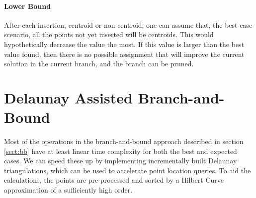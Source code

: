 \paragraph{Lower Bound}
After each insertion, centroid or non-centroid, one can assume that, the best case scenario, all the points not yet inserted will be centroids. This would hypothetically decrease the value the most. If this value is larger than the best value found, then there is no possible assignment that will improve the current solution in the current branch, and the branch can be pruned.
\paragraph{}
\section{Delaunay Assisted Branch-and-Bound}
\label{alg:da}
\paragraph{}
Most of the operations in the branch-and-bound approach described in section \ref{sect:bb} have at least linear time complexity for both the best and expected cases. We can speed these up by implementing incrementally built Delaunay triangulations, which can be used to accelerate point location queries. To aid the calculations, the points are pre-processed and sorted by a Hilbert Curve approximation of a sufficiently high order.

